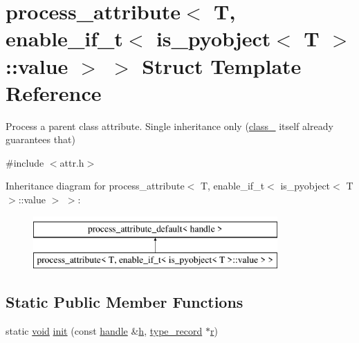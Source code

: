 \hypertarget{structprocess__attribute_3_01_t_00_01enable__if__t_3_01is__pyobject_3_01_t_01_4_1_1value_01_4_01_4}{}\section{process\+\_\+attribute$<$ T, enable\+\_\+if\+\_\+t$<$ is\+\_\+pyobject$<$ T $>$\+::value $>$ $>$ Struct Template Reference}
\label{structprocess__attribute_3_01_t_00_01enable__if__t_3_01is__pyobject_3_01_t_01_4_1_1value_01_4_01_4}


Process a parent class attribute. Single inheritance only (\mbox{\hyperlink{classclass__}{class\+\_\+}} itself already guarantees that)  




{\ttfamily \#include $<$attr.\+h$>$}

Inheritance diagram for process\+\_\+attribute$<$ T, enable\+\_\+if\+\_\+t$<$ is\+\_\+pyobject$<$ T $>$\+::value $>$ $>$\+:\begin{figure}[H]
\begin{center}
\leavevmode
\includegraphics[height=2.000000cm]{structprocess__attribute_3_01_t_00_01enable__if__t_3_01is__pyobject_3_01_t_01_4_1_1value_01_4_01_4}
\end{center}
\end{figure}
\subsection*{Static Public Member Functions}
\begin{DoxyCompactItemize}
\item 
static \mbox{\hyperlink{_s_d_l__opengles2__gl2ext_8h_ae5d8fa23ad07c48bb609509eae494c95}{void}} \mbox{\hyperlink{structprocess__attribute_3_01_t_00_01enable__if__t_3_01is__pyobject_3_01_t_01_4_1_1value_01_4_01_4_ab3249240a84f686a0339448dc63b1841}{init}} (const \mbox{\hyperlink{classhandle}{handle}} \&\mbox{\hyperlink{_s_d_l__opengl__glext_8h_afa0fb1b5e976920c0abeff2dca3ed774}{h}}, \mbox{\hyperlink{structtype__record}{type\+\_\+record}} $\ast$\mbox{\hyperlink{_s_d_l__opengl_8h_a42ce7cdc612e53abee15043f80220d97}{r}})
\end{DoxyCompactItemize}


